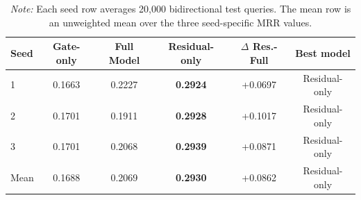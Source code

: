\begin{table}[t]
\centering
\small
\caption{Per-seed fixed-expert model comparison on the test split.}
\label{tab:supp_per_seed_model_comparison}
\setlength{\tabcolsep}{5pt}
\begin{tabular}{lccccc}
\toprule
Seed & Gate-only & Full Model & Residual-only & $\Delta$ Res.-Full & Best model \\
\midrule
1 & 0.1663 & 0.2227 & \textbf{0.2924} & +0.0697 & Residual-only \\
2 & 0.1701 & 0.1911 & \textbf{0.2928} & +0.1017 & Residual-only \\
3 & 0.1701 & 0.2068 & \textbf{0.2939} & +0.0871 & Residual-only \\
Mean & 0.1688 & 0.2069 & \textbf{0.2930} & +0.0862 & Residual-only \\
\bottomrule
\end{tabular}
\vspace{0.4ex}
\caption*{\footnotesize \textit{Note:} Each seed row averages 20,000 bidirectional test queries. The mean row is an unweighted mean over the three seed-specific MRR values.}
\end{table}
